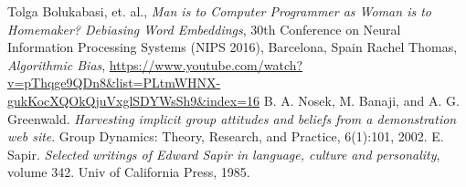 \documentclass[12pt, a4paper]{article}
\begin{document}
		
	\begin{thebibliography}{2}
		 Tolga Bolukabasi, et. al., \emph{Man is to Computer Programmer as Woman is to Homemaker? Debiasing Word Embeddings}, 30th Conference on Neural Information Processing Systems (NIPS 2016), Barcelona, Spain
		 Rachel Thomas, \emph{Algorithmic Bias}, \url{https://www.youtube.com/watch?v=pThqge9QDn8&list=PLtmWHNX-gukKocXQOkQjuVxglSDYWsSh9&index=16}
		 B. A. Nosek, M. Banaji, and A. G. Greenwald. \emph{Harvesting implicit group attitudes and beliefs from a demonstration web site}. Group Dynamics: Theory, Research, and Practice, 6(1):101, 2002.
		  E. Sapir. \emph{Selected writings of Edward Sapir in language, culture and personality}, volume 342. Univ of California Press, 1985.
		
		
		
	\end{thebibliography}
\end{document}
